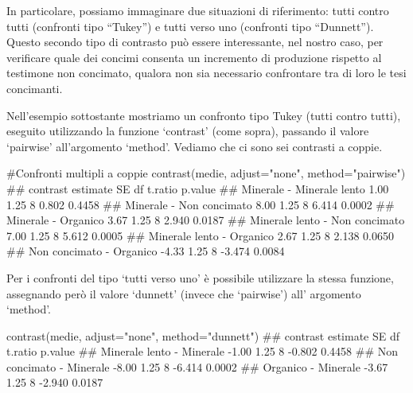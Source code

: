 \documentclass[a4paper,12pt,oneside]{book}
\newenvironment{Shaded}{}{}
\newcommand{\KeywordTok}[1]{#1}
\newcommand{\DataTypeTok}[1]{#1}
\newcommand{\StringTok}[1]{#1}
\newcommand{\CommentTok}[1]{#1}
\newcommand{\NormalTok}[1]{#1}
\begin{document}
In particolare, possiamo immaginare due situazioni di riferimento: tutti contro tutti (confronti tipo ``Tukey'') e tutti verso uno (confronti tipo ``Dunnett''). Questo secondo tipo di contrasto può essere interessante, nel nostro caso, per verificare quale dei concimi consenta un incremento di produzione rispetto al testimone non concimato, qualora non sia necessario confrontare tra di loro le tesi concimanti.

Nell'esempio sottostante mostriamo un confronto tipo Tukey (tutti contro tutti), eseguito utilizzando la funzione `contrast' (come sopra), passando il valore `pairwise' all'argomento `method'. Vediamo che ci sono sei contrasti a coppie.

\footnotesize

\begin{Shaded}
\begin{Highlighting}[]
\CommentTok{#Confronti multipli a coppie}
\KeywordTok{contrast}\NormalTok{(medie, }\DataTypeTok{adjust=}\StringTok{"none"}\NormalTok{, }\DataTypeTok{method=}\StringTok{"pairwise"}\NormalTok{)}
\CommentTok{##  contrast                       estimate   SE df t.ratio p.value}
\CommentTok{##  Minerale - Minerale lento          1.00 1.25  8  0.802  0.4458 }
\CommentTok{##  Minerale - Non concimato           8.00 1.25  8  6.414  0.0002 }
\CommentTok{##  Minerale - Organico                3.67 1.25  8  2.940  0.0187 }
\CommentTok{##  Minerale lento - Non concimato     7.00 1.25  8  5.612  0.0005 }
\CommentTok{##  Minerale lento - Organico          2.67 1.25  8  2.138  0.0650 }
\CommentTok{##  Non concimato - Organico          -4.33 1.25  8 -3.474  0.0084}
\end{Highlighting}
\end{Shaded}

\normalsize

Per i confronti del tipo `tutti verso uno' è possibile utilizzare la stessa funzione, assegnando però il valore `dunnett' (invece che `pairwise') all' argomento `method'.

\small

\begin{Shaded}
\begin{Highlighting}[]
\KeywordTok{contrast}\NormalTok{(medie, }\DataTypeTok{adjust=}\StringTok{"none"}\NormalTok{, }\DataTypeTok{method=}\StringTok{"dunnett"}\NormalTok{)}
\CommentTok{##  contrast                  estimate   SE df t.ratio p.value}
\CommentTok{##  Minerale lento - Minerale    -1.00 1.25  8 -0.802  0.4458 }
\CommentTok{##  Non concimato - Minerale     -8.00 1.25  8 -6.414  0.0002 }
\CommentTok{##  Organico - Minerale          -3.67 1.25  8 -2.940  0.0187}
\end{Highlighting}
\end{Shaded}
\end{document}
